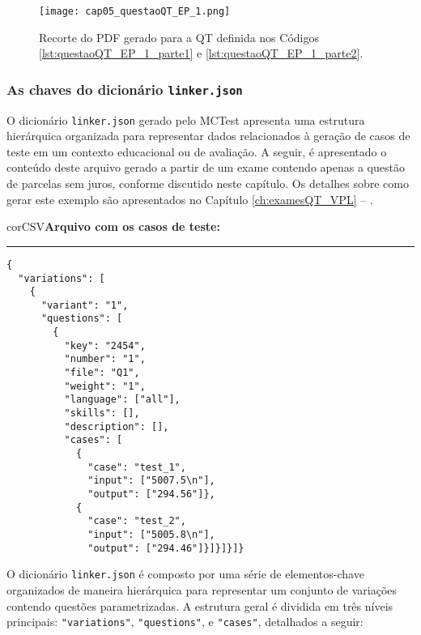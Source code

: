 \begin{figure}[b]
  \texttt{[image: cap05\_questaoQT\_EP\_1.png]}
  \caption{Recorte do PDF gerado para a QT definida nos Códigos \ref{lst:questaoQT_EP_1_parte1} e \ref{lst:questaoQT_EP_1_parte2}.}
  \label{fig:cap05_questaoQT_EP_1}
\end{figure}

\subsubsection{As chaves do dicionário \texttt{linker.json}}

O dicionário \verb|linker.json| gerado pelo MCTest apresenta uma estrutura hierárquica organizada para representar dados relacionados à geração de casos de teste em um contexto educacional ou de avaliação. A seguir, é apresentado o conteúdo deste arquivo gerado a partir de um exame contendo apenas a questão de parcelas sem juros, conforme discutido neste capítulo. Os detalhes sobre como gerar este exemplo são apresentados no Capítulo \ref{ch:examesQT_VPL} -- .

\begin{myboxCode}{corCSV}{\textbf{Arquivo com os casos de teste:}}\vspace{3mm}
    \hrule
    \begin{verbatim}
{
  "variations": [
    {
      "variant": "1",
      "questions": [
        {
          "key": "2454",
          "number": "1",
          "file": "Q1",
          "weight": "1",
          "language": ["all"],
          "skills": [],
          "description": [],
          "cases": [
            {
              "case": "test_1",
              "input": ["5007.5\n"],
              "output": ["294.56"]},
            {
              "case": "test_2",
              "input": ["5005.8\n"],
              "output": ["294.46"]}]}]}]}
\end{verbatim}
\end{myboxCode}


O dicionário \verb|linker.json| é composto por uma série de elementos-chave organizados de maneira hierárquica para representar um conjunto de variações contendo questões parametrizadas. A estrutura geral é dividida em três níveis principais: \verb|"variations"|, \verb|"questions"|, e \verb|"cases"|, detalhados a seguir:

